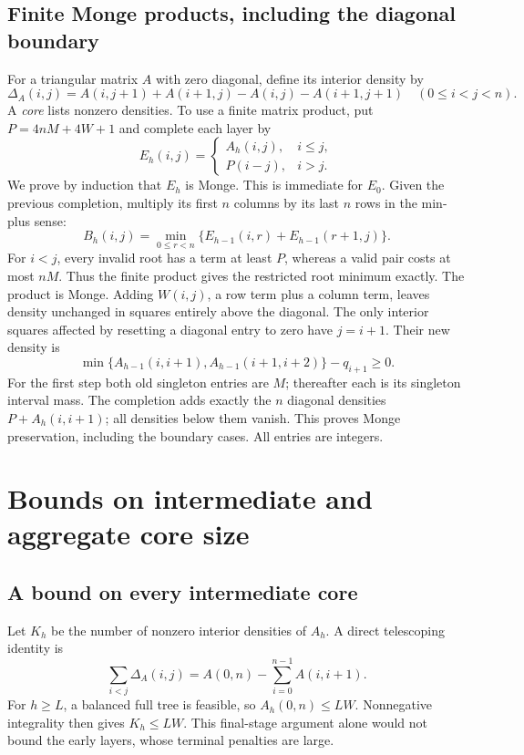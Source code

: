 \documentclass[11pt]{article}
\begin{document}
\subsection{Finite Monge products, including the diagonal boundary}\label{sec:finite-completion}
For a triangular matrix $A$ with zero diagonal, define its interior density by
\[
 \Delta_A(i,j)=A(i,j+1)+A(i+1,j)-A(i,j)-A(i+1,j+1)
 \quad(0\le i<j<n).
\]
A \emph{core} lists nonzero densities. To use a finite matrix product, put
$P=4nM+4W+1$ and complete each layer by
\[
 E_h(i,j)=\begin{cases}A_h(i,j),&i\le j,\\P(i-j),&i>j.\end{cases}
\]
We prove by induction that $E_h$ is Monge. This is immediate for $E_0$.
Given the previous completion, multiply its first $n$ columns by its last
$n$ rows in the min-plus sense:
\[
 B_h(i,j)=\min_{0\le r<n}
       \{E_{h-1}(i,r)+E_{h-1}(r+1,j)\}.
\]
For $i<j$, every invalid root has a term at least $P$, whereas a valid
pair costs at most $nM$. Thus the finite product gives the restricted root
minimum exactly. The product is Monge. Adding $W(i,j)$, a row term plus
a column term, leaves density unchanged in squares entirely above the
diagonal. The only interior squares affected by resetting a diagonal entry
to zero have $j=i+1$. Their new density is
\[
 \min\{A_{h-1}(i,i+1),A_{h-1}(i+1,i+2)\}-q_{i+1}\ge0.
\]
For the first step both old singleton entries are $M$; thereafter each is
its singleton interval mass. The completion adds exactly the $n$ diagonal
densities $P+A_h(i,i+1)$; all densities below them vanish. This proves
Monge preservation, including the boundary cases. All entries are integers.

\section{Bounds on intermediate and aggregate core size}
\label{sec:core-bounds}
\subsection{A bound on every intermediate core}\label{sec:layer-core}
Let $K_h$ be the number of nonzero interior densities of $A_h$.
A direct telescoping identity is
\begin{equation}\label{eq:core-mass}
 \sum_{i<j}\Delta_A(i,j)=A(0,n)-\sum_{i=0}^{n-1}A(i,i+1).
\end{equation}
For $h\ge L$, a balanced full tree is feasible, so $A_h(0,n)\le LW$.
Nonnegative integrality then gives $K_h\le LW$. This final-stage argument
alone would not bound the early layers, whose terminal penalties are large.
\end{document}
